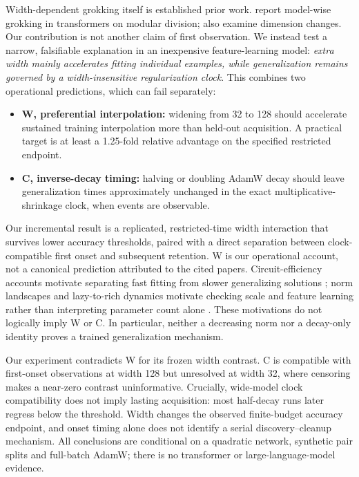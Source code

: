 \documentclass{article}
\begin{document}
Width-dependent grokking itself is established prior work. \citet{davies2023} report model-wise grokking in transformers on modular division; \citet{nanda2023} also examine dimension changes. Our contribution is not another claim of first observation. We instead test a narrow, falsifiable explanation in an inexpensive feature-learning model: \emph{extra width mainly accelerates fitting individual examples, while generalization remains governed by a width-insensitive regularization clock}. This combines two operational predictions, which can fail separately:
\begin{itemize}
\item \textbf{W, preferential interpolation:} widening from 32 to 128 should accelerate sustained training interpolation more than held-out acquisition. A practical target is at least a 1.25-fold relative advantage on the specified restricted endpoint.
\item \textbf{C, inverse-decay timing:} halving or doubling AdamW decay should leave generalization times approximately unchanged in the exact multiplicative-shrinkage clock, when events are observable.
\end{itemize}
Our incremental result is a replicated, restricted-time width interaction that survives lower accuracy thresholds, paired with a direct separation between clock-compatible first onset and subsequent retention. W is our operational account, not a canonical prediction attributed to the cited papers. Circuit-efficiency accounts motivate separating fast fitting from slower generalizing solutions \citep{varma2023}; norm landscapes and lazy-to-rich dynamics motivate checking scale and feature learning rather than interpreting parameter count alone \citep{liu2023,kumar2024}. These motivations do not logically imply W or C. In particular, neither a decreasing norm nor a decay-only identity proves a trained generalization mechanism.

Our experiment contradicts W for its frozen width contrast. C is compatible with first-onset observations at width 128 but unresolved at width 32, where censoring makes a near-zero contrast uninformative. Crucially, wide-model clock compatibility does not imply lasting acquisition: most half-decay runs later regress below the threshold. Width changes the observed finite-budget accuracy endpoint, and onset timing alone does not identify a serial discovery--cleanup mechanism. All conclusions are conditional on a quadratic network, synthetic pair splits and full-batch AdamW; there is no transformer or large-language-model evidence.
\end{document}
